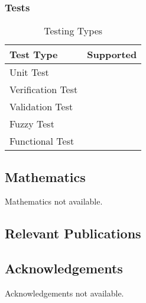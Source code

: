 \subsubsection{Tests}
\begin{table}[h!]
    \centering
    \begin{tabular}{|l|c|}
        \hline
        Test Type & Supported \\
        \hline
        Unit Test &  \\
        Verification Test &  \\
        Validation Test &  \\
        Fuzzy Test &  \\
        Functional Test &  \\
        \hline
    \end{tabular}
    \caption{Testing Types}
\end{table}

\subsection{Mathematics}
\label{sec:Maphys++:mathematics}
Mathematics not available.


\subsection{Relevant Publications}
\label{sec:Maphys++:publications}

\subsection{Acknowledgements}
\label{sec::Maphys++:acknowledgements}

Acknowledgements not available.


